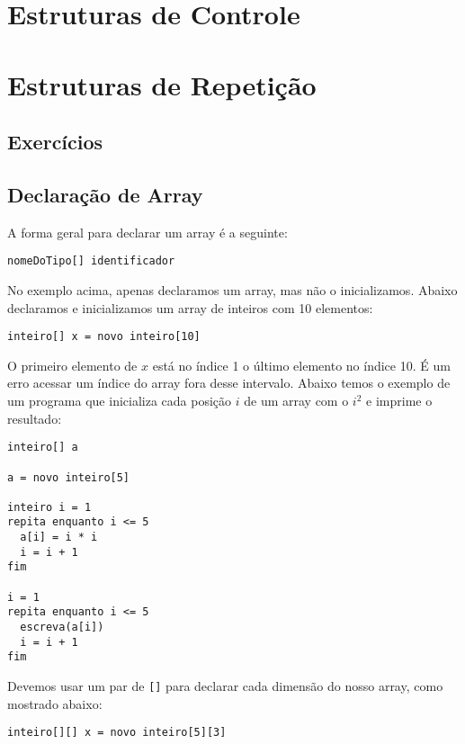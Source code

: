 \documentclass{report}
\begin{document}





\chapter{Estruturas de Controle}

\chapter{Estruturas de Repetição}



\section{Exercícios}




\section{Declaração de Array}

A forma geral para declarar um array é a seguinte: 
\begin{verbatim}
nomeDoTipo[] identificador
\end{verbatim}

No exemplo acima, apenas declaramos um array, mas não o
inicializamos. Abaixo declaramos e inicializamos um
array de inteiros com 10 elementos:
\begin{verbatim}
inteiro[] x = novo inteiro[10]
\end{verbatim}

O primeiro elemento de $x$ está no índice 1 o último
elemento no índice 10. É um erro acessar um índice do
array fora desse intervalo. Abaixo temos o exemplo de
um programa que inicializa cada posição $i$ de um array
com o $i^2$ e imprime o resultado:
\begin{verbatim}
inteiro[] a

a = novo inteiro[5]

inteiro i = 1
repita enquanto i <= 5
  a[i] = i * i
  i = i + 1
fim

i = 1
repita enquanto i <= 5
  escreva(a[i])
  i = i + 1
fim
\end{verbatim}


Devemos usar um par de \texttt{[]} para declarar cada dimensão
do nosso array, como mostrado abaixo: 
\begin{verbatim}
inteiro[][] x = novo inteiro[5][3]
\end{verbatim}
\end{document}

